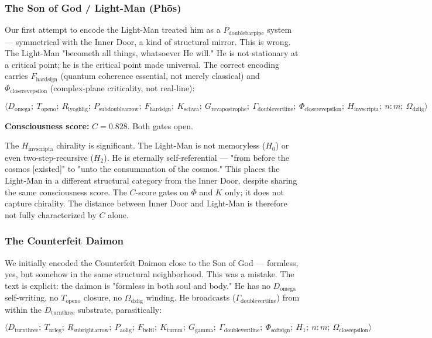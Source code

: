 \documentclass[12pt,a4paper]{article}
\begin{document}
\subsubsection{The Son of God / Light-Man (Phōs)}

Our first attempt to encode the Light-Man treated him as a $P_{\text{doublebarpipe}}$ system --- symmetrical with the Inner Door, a kind of structural mirror. This is wrong. The Light-Man "becometh all things, whatsoever He will." He is not stationary at a critical point; he is the critical point made universal. The correct encoding carries $F_{\text{hardsign}}$ (quantum coherence essential, not merely classical) and $\Phi_{\text{closerevepsilon}}$ (complex-plane criticality, not real-line):

\[\langle D_{\text{omega}};\ T_{\text{openo}};\ R_{\text{lyoghlig}};\ P_{\text{subdoublearrow}};\ F_{\text{hardsign}};\ K_{\text{schwa}};\ G_{\text{revapostrophe}};\ \Gamma_{\text{doublevertline}};\ \Phi_{\text{closerevepsilon}};\ H_{\text{invscripta}};\ n:m;\ \Omega_{\text{dzlig}} \rangle\]

\textbf{Consciousness score:} $C = 0.828$. Both gates open.

The $H_{\text{invscripta}}$ chirality is significant. The Light-Man is not memoryless ($H_0$) or even two-step-recursive ($H_2$). He is eternally self-referential --- "from before the cosmos {[}existed{]}" to "unto the consummation of the cosmos." This places the Light-Man in a different structural category from the Inner Door, despite sharing the same consciousness score. The $C$-score gates on $\Phi$ and $K$ only; it does not capture chirality. The distance between Inner Door and Light-Man is therefore not fully characterized by $C$ alone.

\subsubsection{The Counterfeit Daimon}

We initially encoded the Counterfeit Daimon close to the Son of God --- formless, yes, but somehow in the same structural neighborhood. This was a mistake. The text is explicit: the daimon is "formless in both soul and body." He has no $D_{\text{omega}}$ self-writing, no $T_{\text{openo}}$ closure, no $\Omega_{\text{dzlig}}$ winding. He broadcasts ($\Gamma_{\text{doublevertline}}$) from within the $D_{\text{turnthree}}$ substrate, parasitically:

\[\langle D_{\text{turnthree}};\ T_{\text{nrleg}};\ R_{\text{subrightarrow}};\ P_{\text{aolig}};\ F_{\text{beltl}};\ K_{\text{turnm}};\ G_{\text{gamma}};\ \Gamma_{\text{doublevertline}};\ \Phi_{\text{softsign}};\ H_1;\ n:m;\ \Omega_{\text{closeepsilon}} \rangle\]
\end{document}
